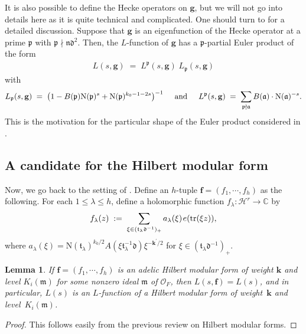 \documentclass[11pt]{amsart}
\newtheorem{lemma}[theorem]{Lemma}
\theoremstyle{remark}
\newcommand\mbf[1]{\mathbf{#1}}
\newcommand\fr[1]{\mathfrak{#1}}
\newcommand{\comp}{\mathbb{C}}
\newcommand{\clh}{\mathcal{H}}
\newcommand{\clo}{\mathcal{O}}
\newcommand{\eq}{\;=\;}
\newcommand{\deq}{\;:=\;}
\def\thin{{\hskip 1pt}}
\newcommand{\N}{\mathrm{N}}
\newcommand{\tr}{\mathrm{tr}}
\begin{document}
It is also possible to define the Hecke operators on $\mbf{g}$, but we will not go into details here as it is quite technical and complicated. One should turn to \cite[Section~2]{shimurahmf} for a detailed discussion. Suppose that $\mbf{g}$ is an eigenfunction of the Hecke operator at a prime $\fr{p}$ with $\fr{p}\nmid\fr{n}\fr{d}^2$. Then, the $L$-function of $\mbf{g}$ has a $\fr{p}$-partial Euler product of the form
\begin{align*}
    L(s,\mbf{g})\eq L^\fr{p}(s,\mbf{g})\;L_\fr{p}(s,\mbf{g})
\end{align*}
with
\begin{align*}
   L_\fr{p}(s,\mbf{g})\eq\big(1-B(\fr{p})\N(\fr{p})^s+\N(\fr{p})^{k_0-1-2s}\big)^{-1}\hspace{0.5cm}\text{and}\hspace{0.5cm}
    L^\fr{p}(s,\mbf{g})\eq\sum_{\fr{p}\nmid\fr{a}}B(\fr{a})\cdot\N(\fr{a})^{-s}.
\end{align*}
This is the motivation for the particular shape of the Euler product considered in .

\subsection{A candidate for the Hilbert modular form}

Now, we go back to the setting of . Define an $h$-tuple $\mbf{f}=(f_1,\cdots,f_h)$ as the following. For each $1\leq\lambda\leq h$, define a holomorphic function $f_\lambda:\clh^r\rightarrow\comp$ by
\begin{align*}
    f_\lambda(z)\deq\sum_{\xi\in(\fr{t}_\lambda\fr{d}^{-1})_+}a_\lambda(\xi)\thin e(\tr(\xi z)),
\end{align*}
where $a_\lambda(\xi)=\N(\fr{t}_\lambda)^{k_0/2}A(\xi\fr{t}_\lambda^{-1}\fr{d})\xi^{-\mbf{k}^\prime/2}$ for $\xi\in(\fr{t}_\lambda\fr{d}^{-1})_+$.

\begin{lemma}
\label{fhmf}
If $\mbf{f}=(f_1,\cdots,f_h)$ is an adelic Hilbert modular form of weight $\mbf{k}$ and level $K_i(\fr{m})$ for some nonzero ideal $\fr{m}$ of $\clo_F$, then \mbox{$L(s,\mbf{f})=L(s)$}, and in particular, $L(s)$ is an $L$-function of a Hilbert modular form of weight~$\mbf{k}$ and level~$K_i(\fr{m})$.
\end{lemma}
\begin{proof}
This follows easily from the previous review on Hilbert modular forms.
\end{proof}
\end{document}

